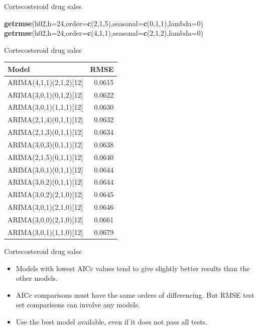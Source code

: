 \documentclass[14pt,ignorenonframetext,]{beamer}
\newenvironment{Shaded}{\begin{snugshade}}{\end{snugshade}}
\newcommand{\KeywordTok}[1]{\textcolor[rgb]{0.13,0.29,0.53}{\textbf{#1}}}
\newcommand{\DataTypeTok}[1]{\textcolor[rgb]{0.13,0.29,0.53}{#1}}
\newcommand{\DecValTok}[1]{\textcolor[rgb]{0.00,0.00,0.81}{#1}}
\newcommand{\NormalTok}[1]{#1}
\providecommand{\tightlist}{%
  \setlength{\itemsep}{0pt}\setlength{\parskip}{0pt}}
\begin{document}
\begin{frame}[fragile]{Cortecosteroid drug sales}
\begin{Shaded}
\begin{Highlighting}[]
\KeywordTok{getrmse}\NormalTok{(h02,}\DataTypeTok{h=}\DecValTok{24}\NormalTok{,}\DataTypeTok{order=}\KeywordTok{c}\NormalTok{(}\DecValTok{2}\NormalTok{,}\DecValTok{1}\NormalTok{,}\DecValTok{5}\NormalTok{),}\DataTypeTok{seasonal=}\KeywordTok{c}\NormalTok{(}\DecValTok{0}\NormalTok{,}\DecValTok{1}\NormalTok{,}\DecValTok{1}\NormalTok{),}\DataTypeTok{lambda=}\DecValTok{0}\NormalTok{)}
\KeywordTok{getrmse}\NormalTok{(h02,}\DataTypeTok{h=}\DecValTok{24}\NormalTok{,}\DataTypeTok{order=}\KeywordTok{c}\NormalTok{(}\DecValTok{4}\NormalTok{,}\DecValTok{1}\NormalTok{,}\DecValTok{1}\NormalTok{),}\DataTypeTok{seasonal=}\KeywordTok{c}\NormalTok{(}\DecValTok{2}\NormalTok{,}\DecValTok{1}\NormalTok{,}\DecValTok{2}\NormalTok{),}\DataTypeTok{lambda=}\DecValTok{0}\NormalTok{)}
\end{Highlighting}
\end{Shaded}

\end{frame}

\begin{frame}{Cortecosteroid drug sales}

\fontsize{12}{14}\sf

\begin{longtable}[]{@{}lr@{}}
\toprule
Model & RMSE\tabularnewline
\midrule
\endhead
ARIMA(4,1,1)(2,1,2){[}12{]} & 0.0615\tabularnewline
ARIMA(3,0,1)(0,1,2){[}12{]} & 0.0622\tabularnewline
ARIMA(3,0,1)(1,1,1){[}12{]} & 0.0630\tabularnewline
ARIMA(2,1,4)(0,1,1){[}12{]} & 0.0632\tabularnewline
ARIMA(2,1,3)(0,1,1){[}12{]} & 0.0634\tabularnewline
ARIMA(3,0,3)(0,1,1){[}12{]} & 0.0638\tabularnewline
ARIMA(2,1,5)(0,1,1){[}12{]} & 0.0640\tabularnewline
ARIMA(3,0,1)(0,1,1){[}12{]} & 0.0644\tabularnewline
ARIMA(3,0,2)(0,1,1){[}12{]} & 0.0644\tabularnewline
ARIMA(3,0,2)(2,1,0){[}12{]} & 0.0645\tabularnewline
ARIMA(3,0,1)(2,1,0){[}12{]} & 0.0646\tabularnewline
ARIMA(3,0,0)(2,1,0){[}12{]} & 0.0661\tabularnewline
ARIMA(3,0,1)(1,1,0){[}12{]} & 0.0679\tabularnewline
\bottomrule
\end{longtable}

\end{frame}

\begin{frame}{Cortecosteroid drug sales}

\begin{itemize}
\tightlist
\item
  Models with lowest AICc values tend to give slightly better results
  than the other models.
\item
  AICc comparisons must have the same orders of differencing. But RMSE
  test set comparisons can involve any models.
\item
  Use the best model available, even if it does not pass all tests.
\end{itemize}

\end{frame}
\end{document}
